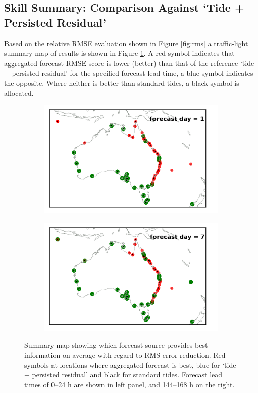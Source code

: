 \subsection{Skill Summary: Comparison Against `Tide + Persisted Residual'}
Based on the relative RMSE evaluation shown in Figure \ref{fig:rms} a traffic-light summary map of results is shown in Figure \ref{fig:map_rms}.
A red symbol indicates that aggregated forecast RMSE score is lower (better) than that of the reference `tide + persisted residual' for the specified forecast lead time, a blue symbol indicates the opposite.  Where neither is better than standard tides, a black symbol is allocated.   
\begin{figure}[H]
    \centering
    \begin{subfigure}[b]{0.45\textwidth}
        \includegraphics[width=\textwidth]{figures/maps/plot_map_rms_score_day_1.png}
    \end{subfigure}
    \begin{subfigure}[b]{0.45\textwidth}
        \includegraphics[width=\textwidth]{figures/maps/plot_map_rms_score_day_7.png}
    \end{subfigure}
    \caption{ Summary map showing which forecast source provides best information on average with regard to RMS error reduction. Red symbols at locations where aggregated forecast is best, blue for `tide + persisted residual' and black for standard tides.  Forecast lead times of 0--24 h are shown in left panel, and 144--168 h on the right.}
    \label{fig:map_rms}\vspace{-3pt}
\end{figure}   



